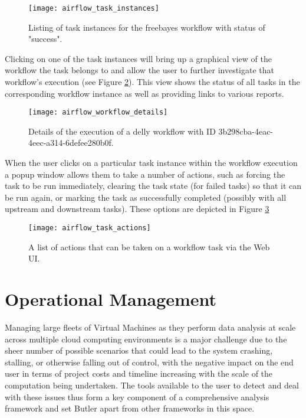 \begin{figure}[h]
\texttt{[image: airflow\_task\_instances]}
\centering
\caption {Listing of task instances for the freebayes workflow with status of "success".}
\label{fig:airflow_task_instances}
\end{figure}

Clicking on one of the task instances will bring up a graphical view of the workflow the task belongs to and allow the user to further investigate that workflow's execution (see Figure \ref{fig:airflow_workflow_details}). This view shows the status of all tasks in the corresponding workflow instance as well as providing links to various reports.

\begin{figure}[h]
\texttt{[image: airflow\_workflow\_details]}
\centering
\caption {Details of the execution of a delly workflow with ID 3b298cba-4eac-4eec-a314-6defee280b0f.}
\label{fig:airflow_workflow_details}
\end{figure}

When the user clicks on a particular task instance within the workflow execution a popup window allows them to take a number of actions, such as forcing the task to be run immediately, clearing the task state (for failed tasks) so that it can be run again, or marking the task as successfully completed (possibly with all upstream and downstream tasks). These options are depicted in Figure \ref{fig:airflow_task_actions}

\begin{figure}[h]
\texttt{[image: airflow\_task\_actions]}
\centering
\caption {A list of actions that can be taken on a workflow task via the Web UI.}
\label{fig:airflow_task_actions}
\end{figure}

\section{Operational Management}\label{sec:operational_management}

Managing large fleets of Virtual Machines as they perform data analysis at scale across multiple cloud computing environments is a major challenge due to the sheer number of possible scenarios that could lead to the system crashing, stalling, or otherwise falling out of control, with the negative impact on the end user in terms of project costs and timeline increasing with the scale of the computation being undertaken. The tools available to the user to detect and deal with these issues thus form a key component of a comprehensive analysis framework and set Butler apart from other frameworks in this space.

